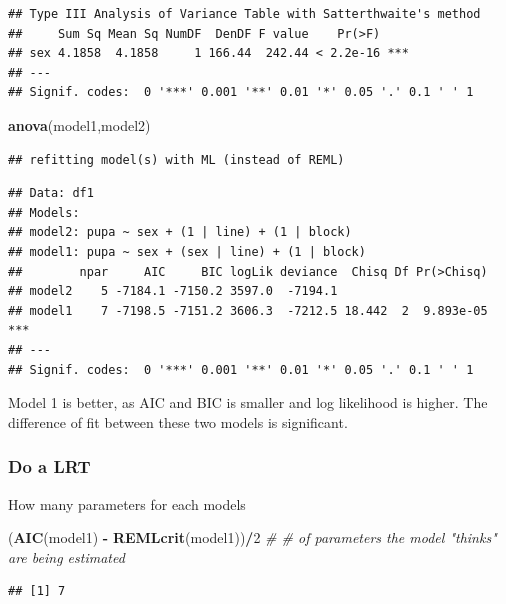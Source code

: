 \documentclass[
]{article}
\newenvironment{Shaded}{\begin{snugshade}}{\end{snugshade}}
\newcommand{\CommentTok}[1]{\textcolor[rgb]{0.56,0.35,0.01}{\textit{#1}}}
\newcommand{\DecValTok}[1]{\textcolor[rgb]{0.00,0.00,0.81}{#1}}
\newcommand{\KeywordTok}[1]{\textcolor[rgb]{0.13,0.29,0.53}{\textbf{#1}}}
\newcommand{\NormalTok}[1]{#1}
\newcommand{\OperatorTok}[1]{\textcolor[rgb]{0.81,0.36,0.00}{\textbf{#1}}}
\newcommand{\StringTok}[1]{\textcolor[rgb]{0.31,0.60,0.02}{#1}}
\begin{document}
\begin{verbatim}
## Type III Analysis of Variance Table with Satterthwaite's method
##     Sum Sq Mean Sq NumDF  DenDF F value    Pr(>F)    
## sex 4.1858  4.1858     1 166.44  242.44 < 2.2e-16 ***
## ---
## Signif. codes:  0 '***' 0.001 '**' 0.01 '*' 0.05 '.' 0.1 ' ' 1
\end{verbatim}

\begin{Shaded}
\begin{Highlighting}[]
\KeywordTok{anova}\NormalTok{(model1,model2)}
\end{Highlighting}
\end{Shaded}

\begin{verbatim}
## refitting model(s) with ML (instead of REML)
\end{verbatim}

\begin{verbatim}
## Data: df1
## Models:
## model2: pupa ~ sex + (1 | line) + (1 | block)
## model1: pupa ~ sex + (sex | line) + (1 | block)
##        npar     AIC     BIC logLik deviance  Chisq Df Pr(>Chisq)    
## model2    5 -7184.1 -7150.2 3597.0  -7194.1                         
## model1    7 -7198.5 -7151.2 3606.3  -7212.5 18.442  2  9.893e-05 ***
## ---
## Signif. codes:  0 '***' 0.001 '**' 0.01 '*' 0.05 '.' 0.1 ' ' 1
\end{verbatim}

Model 1 is better, as AIC and BIC is smaller and log likelihood is
higher. The difference of fit between these two models is significant.

\hypertarget{do-a-lrt-1}{%
\subsubsection{Do a LRT}\label{do-a-lrt-1}}

How many parameters for each models

\begin{Shaded}
\begin{Highlighting}[]
\NormalTok{(}\KeywordTok{AIC}\NormalTok{(model1) }\OperatorTok{-}\StringTok{ }\KeywordTok{REMLcrit}\NormalTok{(model1))}\OperatorTok{/}\DecValTok{2} \CommentTok{# # of parameters the model "thinks" are being estimated}
\end{Highlighting}
\end{Shaded}

\begin{verbatim}
## [1] 7
\end{verbatim}
\end{document}
